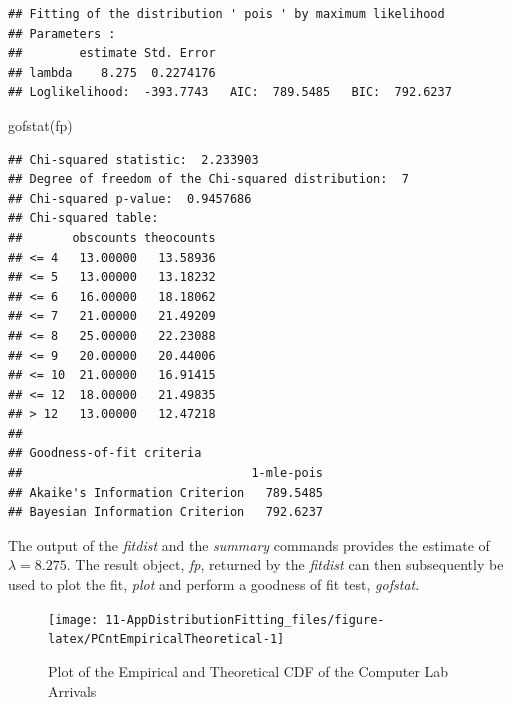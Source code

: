 \documentclass[
]{book}
\newenvironment{Shaded}{\begin{snugshade}}{\end{snugshade}}
\newcommand{\FunctionTok}[1]{\textcolor[rgb]{0.00,0.00,0.00}{#1}}
\newcommand{\NormalTok}[1]{#1}
\newcommand{\OtherTok}[1]{\textcolor[rgb]{0.56,0.35,0.01}{#1}}
\newcommand{\SpecialCharTok}[1]{\textcolor[rgb]{0.00,0.00,0.00}{#1}}
\newcommand{\StringTok}[1]{\textcolor[rgb]{0.31,0.60,0.02}{#1}}
\theoremstyle{definition}
\theoremstyle{definition}
\theoremstyle{definition}
\theoremstyle{definition}
\theoremstyle{remark}
\begin{document}
\begin{Shaded}
\end{Shaded}

\begin{verbatim}
## Fitting of the distribution ' pois ' by maximum likelihood 
## Parameters : 
##        estimate Std. Error
## lambda    8.275  0.2274176
## Loglikelihood:  -393.7743   AIC:  789.5485   BIC:  792.6237
\end{verbatim}

\begin{Shaded}
\begin{Highlighting}[]
\FunctionTok{gofstat}\NormalTok{(fp)}
\end{Highlighting}
\end{Shaded}

\begin{verbatim}
## Chi-squared statistic:  2.233903 
## Degree of freedom of the Chi-squared distribution:  7 
## Chi-squared p-value:  0.9457686 
## Chi-squared table:
##       obscounts theocounts
## <= 4   13.00000   13.58936
## <= 5   13.00000   13.18232
## <= 6   16.00000   18.18062
## <= 7   21.00000   21.49209
## <= 8   25.00000   22.23088
## <= 9   20.00000   20.44006
## <= 10  21.00000   16.91415
## <= 12  18.00000   21.49835
## > 12   13.00000   12.47218
## 
## Goodness-of-fit criteria
##                                1-mle-pois
## Akaike's Information Criterion   789.5485
## Bayesian Information Criterion   792.6237
\end{verbatim}

The output of the \emph{fitdist} and the \emph{summary} commands provides the
estimate of \(\lambda = 8.275\). The result object, \emph{fp}, returned by the
\emph{fitdist} can then subsequently be used to plot the fit, \emph{plot} and
perform a goodness of fit test, \emph{gofstat}.

\begin{figure}

{\centering \texttt{[image: 11-AppDistributionFitting\_files/figure-latex/PCntEmpiricalTheoretical-1]} 

}

\caption{Plot of the Empirical and Theoretical CDF of the Computer Lab Arrivals}\label{fig:PCntEmpiricalTheoretical}
\end{figure}
\end{document}
